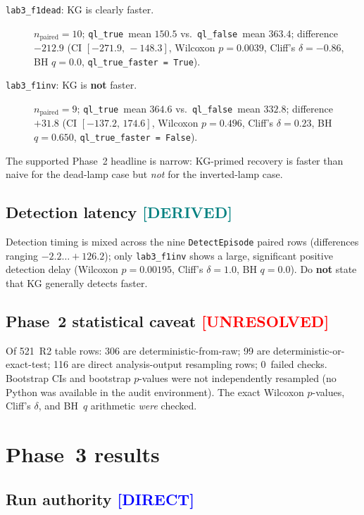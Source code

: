 \documentclass[12pt, a4paper, oneside]{memoir}
\newcommand{\evDirect}{\textcolor{blue}{[DIRECT]}}
\newcommand{\evDerived}{\textcolor{teal}{[DERIVED]}}
\newcommand{\evUnresolved}{\textcolor{red}{[UNRESOLVED]}}
\newcommand{\qlT}{\texttt{ql\_true}}
\newcommand{\qlF}{\texttt{ql\_false}}
\begin{document}
\begin{description}
  \item[\texttt{lab3\_f1dead}: KG is clearly faster.]
    $n_{\text{paired}} = 10$; \qlT\ mean $150.5$ vs.\ \qlF\ mean $363.4$;
    difference $-212.9$ (CI $[-271.9,\,-148.3]$, Wilcoxon $p = 0.0039$,
    Cliff's $\delta = -0.86$, BH $q = 0.0$, \texttt{ql\_true\_faster = True}).

  \item[\texttt{lab3\_f1inv}: KG is \textbf{not} faster.]
    $n_{\text{paired}} = 9$; \qlT\ mean $364.6$ vs.\ \qlF\ mean $332.8$;
    difference $+31.8$ (CI $[-137.2,\,174.6]$, Wilcoxon $p = 0.496$,
    Cliff's $\delta = 0.23$, BH $q = 0.650$, \texttt{ql\_true\_faster = False}).
\end{description}

The supported Phase~2 headline is narrow: KG-primed recovery is faster than
naive for the dead-lamp case but \emph{not} for the inverted-lamp case.

\subsection{Detection latency \evDerived}

Detection timing is mixed across the nine \texttt{DetectEpisode} paired rows
(differences ranging $-2.2\ldots+126.2$); only \texttt{lab3\_f1inv} shows a
large, significant positive detection delay (Wilcoxon $p = 0.00195$, Cliff's
$\delta = 1.0$, BH $q = 0.0$).  Do \textbf{not} state that KG generally
detects faster.

\subsection{Phase~2 statistical caveat \evUnresolved}

Of 521~R2 table rows: 306 are deterministic-from-raw; 99 are
deterministic-or-exact-test; 116 are direct analysis-output resampling rows;
0~failed checks.  Bootstrap CIs and bootstrap $p$-values were not
independently resampled (no Python was available in the audit environment).
The exact Wilcoxon $p$-values, Cliff's $\delta$, and BH~$q$ arithmetic
\emph{were} checked.

\section{Phase~3 results}
\label{sec:eval-phase3}

\subsection{Run authority \evDirect}
\end{document}
